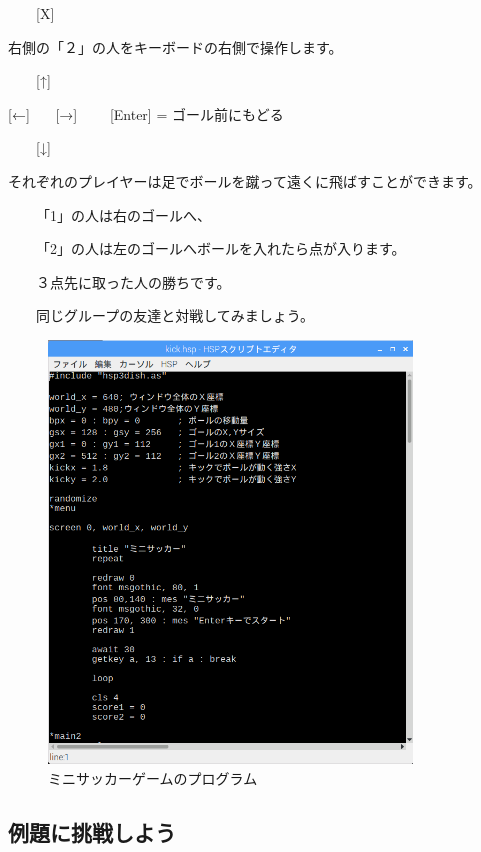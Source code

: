 \ \ \ \ [X]



右側の「２」の人をキーボードの右側で操作します。




\ \ \ \ [↑]

[←] \ \ \ [→] \ \ \ \ [Enter] = ゴール前にもどる

\ \ \ \ [↓]




それぞれのプレイヤーは足でボールを蹴って遠くに飛ばすことができます。

\ \ \ \ 「1」の人は右のゴールへ、

\ \ \ \ 「2」の人は左のゴールへボールを入れたら点が入ります。


\ \ \ \ ３点先に取った人の勝ちです。

\ \ \ \ 同じグループの友達と対戦してみましょう。



\begin{figure}[H]
    \begin{center}
      \includegraphics[keepaspectratio,width=9.657cm,height=11.229cm]{text04-img/s_kicksrc.png}
      \caption{ミニサッカーゲームのプログラム}
    \end{center}
    \label{fig:prog_menu}
\end{figure}


\newpage
\subsection{例題に挑戦しよう}

